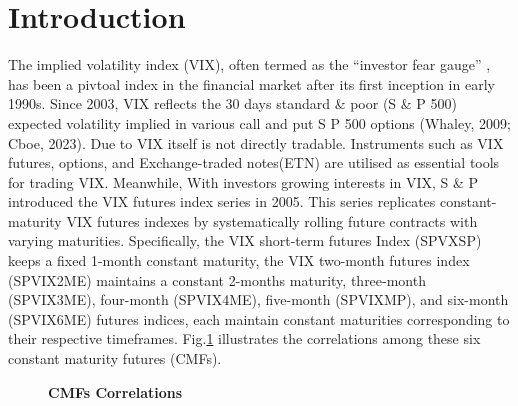 \documentclass[10pt,letterpaper]{article}
\begin{document}
\section*{Introduction}
The implied volatility index (VIX), often termed as the “investor fear gauge” , has been a pivtoal index in the financial market after its first inception in early 1990s. Since 2003, VIX reflects the 30 days standard \& poor (S \& P 500) expected volatility implied in various call and put S P 500 options (Whaley, 2009; Cboe, 2023). Due to VIX itself is not directly tradable. Instruments such as VIX futures, options, and Exchange-traded notes(ETN) are utilised as essential tools for trading VIX. Meanwhile, With investors growing interests in VIX, S \& P introduced the VIX futures index series in 2005. This series replicates constant-maturity VIX futures indexes by systematically rolling future contracts with varying maturities. Specifically, the VIX short-term futures Index (SPVXSP) keeps a fixed 1-month constant maturity, the VIX two-month futures index (SPVIX2ME) maintains a constant 2-months maturity, three-month (SPVIX3ME), four-month (SPVIX4ME), five-month (SPVIXMP), and six-month (SPVIX6ME) futures indices, each maintain constant maturities corresponding to their respective timeframes. Fig.\ref{fig1} illustrates the correlations among these six constant maturity futures (CMFs).

\begin{figure}[!h]
\caption{\bf CMFs Correlations}
\label{fig1}
\end{figure}
\end{document}
